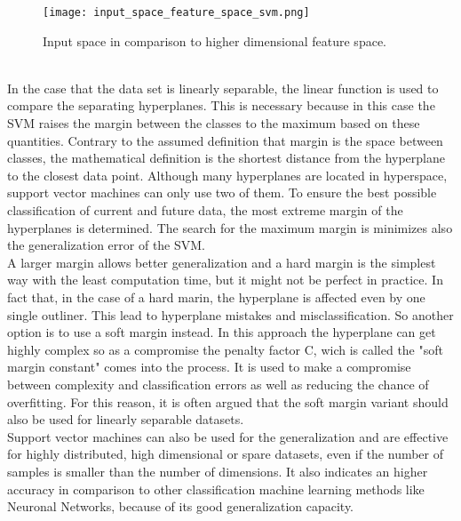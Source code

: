 \documentclass[../masterarbeit.tex]{subfiles}
\begin{document}
\begin{figure}[h]
    \centering
    \texttt{[image: input\_space\_feature\_space\_svm.png]}
    \caption{Input space in comparison to higher dimensional feature space.}
\end{figure}
\\
In the case that the data set is linearly separable, the linear function is used to compare the separating hyperplanes. This is necessary because in this case the SVM raises the margin between the classes to the maximum based on these quantities. Contrary to the assumed definition that margin is the space between classes, the mathematical definition is the shortest distance from the hyperplane to the closest data point. Although many hyperplanes are located in hyperspace, support vector machines can only use two of them. To ensure the best possible classification of current and future data, the most extreme margin of the hyperplanes is determined. \autocite[]{SUBASI202091}
The search for the maximum margin is minimizes also the generalization error of the SVM. \autocite[]{SUGUMARAN2007930} \\
A larger margin allows better generalization and a hard margin is the simplest way with the least computation time, but it might not be perfect in practice. In fact that, in the case of a hard marin, the hyperplane is affected even by one single outliner. This lead to hyperplane mistakes and misclassification. So another option is to use a soft margin instead. In this approach the hyperplane can get highly complex so as a compromise the penalty factor C, wich is called the "soft margin constant" comes into the process. It is used to make a compromise between complexity and classification errors as well as reducing the chance of overfitting. For this reason, it is often argued that the soft margin variant should also be used for linearly separable datasets. \autocite[]{PISNER2020101} \textcite[]{GHOLAMI2017515} \\
Support vector machines can also be used for the generalization and are effective for highly distributed, high dimensional or spare datasets, even if the number of samples is smaller than the number of dimensions. It also indicates an higher accuracy in comparison to other classification machine learning methods like Neuronal Networks, because of its good generalization capacity. \autocite[]{SUBASI202091} \textcite[]{Scikit-learn-svm:2022} 
\end{document}
